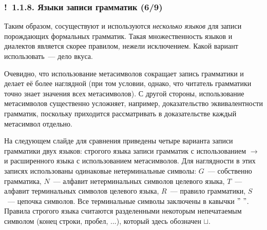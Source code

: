 \documentclass[mathserif,12pt,aspectratio=169]{beamer}
\def\emразделенной{\em разделенной}
\def\em#1{\it\color{blue}#1}
\def\Ok{{\color{green}\textbf{!}\ }}
\begin{document}
\begin{frame}
\frametitle{\Ok 1.1.8. Языки записи грамматик (6/9)}

Таким образом, сосуществуют и используются 
{\em несколько языков} для записи порождающих
формальных грамматик. Такая множественность 
языков и диалектов является скорее правилом,
нежели исключением. Какой вариант использовать~---
дело вкуса. 

\smallskip
Очевидно, что использование метасимволов
сокращает запись грамматики и делает её более наглядной
(при том условии, однако, что читатель грамматики
точно знает значения всех метасимволов).
С другой стороны, использование метасимволов
существенно усложняет, например, доказательство
эквивалентности грамматик, поскольку
приходится рассматривать в доказательстве 
каждый метасимвол отдельно. 
 
\begin{example} 
На следующем слайде для сравнения приведены четыре варианта
записи грамматики двух языков:
строгого языка  записи грамматик с использованием $\rightarrow$ и
расширенного языка с использованием метасимволов.
Для наглядности в этих записях использованы
одинаковые нетерминальные символы:
$G$~--- собственно грамматика,
$N$~--- алфавит нетерминальных символов целевого языка,
$T$~--- алфавит терминальных символов целевого языка,
$R$~--- правило грамматики,
$S$~--- цепочка символов.
Все терминальные символы заключены в кавычки $"\ "$.
Правила строгого языка считаются разделенными
некоторым непечатаемым символом (конец строки, пробел, ...),
который здесь обозначен $\sqcup$.
\end{example}

\end{frame}
\end{document}
